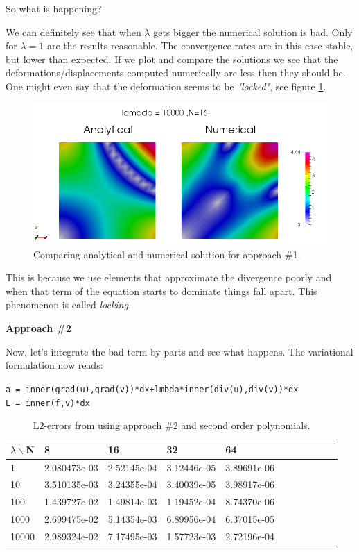 \documentclass[11pt,a4paper,english]{article}
\numberwithin{equation}{section}
\begin{document}
So what is happening? 

We can definitely see that when $\lambda$ gets bigger the numerical solution is bad. Only for $\lambda=1$ are the results reasonable. The convergence rates are in this case stable, but lower than expected. If we plot and compare the solutions we see that the deformations/displacements computed numerically are less then they should be. One might even say that the deformation seems to be \emph{"locked"}, see figure \ref{fig:locking}.

\begin{figure}[h!] 
\begin{center}
  \includegraphics[scale=0.4]{locking.png}
  \end{center}
  \caption{Comparing analytical and numerical solution for approach \#1.}
  \label{fig:locking}
\end{figure}

This is because we use elements that approximate the divergence poorly and when that term of the equation starts to dominate things fall apart. This phenomenon is called \emph{locking.} 

\textbf{Approach \#2}

Now, let's integrate the bad term by parts and see what happens. The variational formulation now reads:

\begin{framed} 
\texttt{a = inner(grad(u),grad(v))*dx+lmbda*inner(div(u),div(v))*dx \\
L = inner(f,v)*dx}
\end{framed}

\begin{table}[H]
\centering
\caption{ L2-errors from using approach \#2 and second order polynomials. }
\vspace{3mm}
\begin{tabular}{|l|l|l|l|l|l|l|l|l|l|l|}
\hline
$\lambda \backslash$N & 8 & 16 & 32 & 64 \\
\hline
1 & 2.080473e-03 & 2.52145e-04 & 3.12446e-05 & 3.89691e-06 \\
\hline
10 & 3.510135e-03 & 3.24355e-04 & 3.40039e-05 & 3.98917e-06 \\
\hline
100 & 1.439727e-02 & 1.49814e-03 & 1.19452e-04 & 8.74370e-06 \\
\hline
1000 & 2.699475e-02 & 5.14354e-03 & 6.89956e-04 & 6.37015e-05 \\
\hline
10000 & 2.989324e-02 & 7.17495e-03 & 1.57723e-03 & 2.72196e-04 \\
\hline
\end{tabular}
\end{table}
\end{document}
